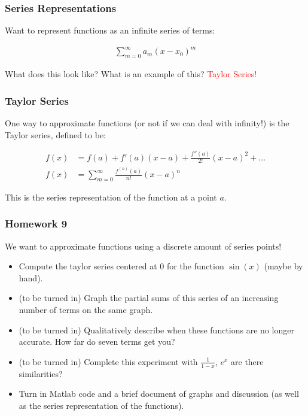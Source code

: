 \documentclass[serif]{beamer}
\begin{document}
%
%
\begin{frame}
\frametitle{Series Representations} 

Want to represent functions as an infinite series of terms: 

\begin{align*}
\sum_{m=0}^{\infty}a_m(x-x_0)^m 
\end{align*}

What does this look like? What is an example of this? \textcolor{red}{Taylor Series!}
\end{frame}


\begin{frame}
\frametitle{Taylor Series} 

One way to approximate functions (or not if we can deal with infinity!) is the Taylor series, defined to be: 

\begin{align*}
f(x) &= f(a) + f'(a)(x-a) + \frac{f''(a)}{2!}(x-a)^2 + \hdots\\
f(x) &= \sum_{m=0}^{\infty}\frac{f^(n)(a)}{n!}(x-a)^n
\end{align*}

This is the series representation of the function at a point $a$. 

\end{frame}

\begin{frame}
\frametitle{Homework 9}

We want to approximate functions using a discrete amount of series points! 

\begin{itemize}
\item Compute the taylor series centered at 0 for the function $\sin(x)$ (maybe by hand).
\item (to be turned in) Graph the partial sums of this series of an increasing number of terms on the same graph. 
\item (to be turned in) Qualitatively describe when these functions are no longer accurate. How far do seven terms get you? 
\item (to be turned in) Complete this experiment with $\frac{1}{1-x}$, $e^x$ are there similarities? 
\item Turn in Matlab code and a brief document of graphs and discussion (as well as the series representation of the functions). 
\end{itemize}

\end{frame}
\end{document}
